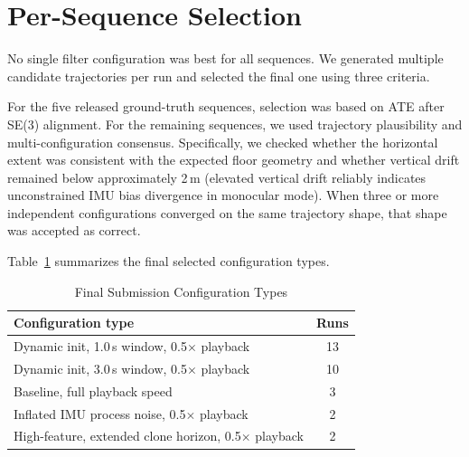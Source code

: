 \documentclass[journal]{IEEEtran}
\begin{document}
\section{Per-Sequence Selection}

No single filter configuration was best for all sequences.
We generated multiple candidate trajectories per run and selected the final
one using three criteria.

For the five released ground-truth sequences, selection was based on ATE after
SE(3) alignment.
For the remaining sequences, we used trajectory plausibility and
multi-configuration consensus.
Specifically, we checked whether the horizontal extent was consistent with the
expected floor geometry and whether vertical drift remained below approximately
2\,m (elevated vertical drift reliably indicates unconstrained IMU bias
divergence in monocular mode).
When three or more independent configurations converged on the same trajectory
shape, that shape was accepted as correct.

Table~\ref{tab:config_distribution} summarizes the final selected
configuration types.

\begin{table}[!t]
\renewcommand{\arraystretch}{1.2}
\caption{Final Submission Configuration Types}
\label{tab:config_distribution}
\centering
\begin{tabular}{l c}
\hline
Configuration type & Runs \\
\hline
Dynamic init, 1.0\,s window, 0.5$\times$ playback & 13 \\
Dynamic init, 3.0\,s window, 0.5$\times$ playback & 10 \\
Baseline, full playback speed & 3 \\
Inflated IMU process noise, 0.5$\times$ playback & 2 \\
High-feature, extended clone horizon, 0.5$\times$ playback & 2 \\
\hline
\end{tabular}
\end{table}
\end{document}
